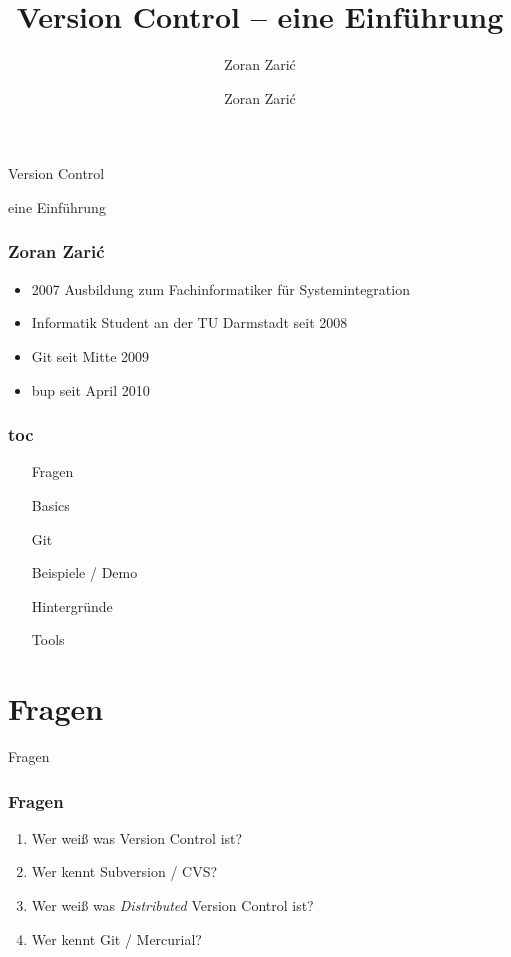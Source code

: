 \documentclass[]{beamer}
\begin{document}

\title[Version Control]{Version Control -- eine Einführung}
\subtitle[Zoran Zari\'c]{Zoran Zari\'c}
\author[Zoran Zari\'c]{Zoran Zari\'c}

\begin{frame}
	\fontsize{30}{10}\selectfont Version Control
	\vspace*{0.5cm}

	\fontsize{20}{10}\selectfont eine Einführung
\end{frame}

\begin{frame}
	\frametitle{Zoran Zari\'c}
	\begin{itemize}
		\item
			2007 Ausbildung zum Fachinformatiker für Systemintegration
		\item
			Informatik Student an der TU Darmstadt seit 2008
		\item
			Git seit Mitte 2009
		\item
			bup seit April 2010
	\end{itemize}
\end{frame}

\begin{frame}
	\frametitle{toc}
	\begin{enumerate}
		\item
			Fragen
		\item
			Basics
		\item
			Git
		\item
			Beispiele / Demo
		\item
			Hintergründe
		\item
			Tools
	\end{enumerate}
\end{frame}

\section{Fragen}
\begin{frame}
	\fontsize{30}{10}\selectfont Fragen
\end{frame}

\begin{frame}
	\frametitle{Fragen}
	\begin{enumerate}
		\item<1->
			Wer weiß was Version Control ist?
		\item<2->
			Wer kennt Subversion / CVS?
		\item<3->
			Wer weiß was \emph{Distributed} Version Control ist?
		\item<4->
			Wer kennt Git / Mercurial?

	\end{enumerate}
\end{frame}
\end{document}
